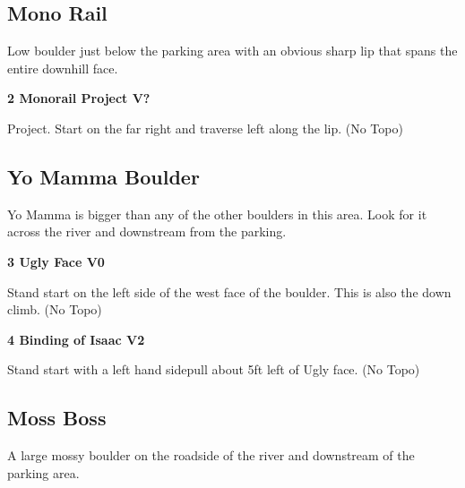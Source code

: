 \begin{multicols}{2}
			
		
		
		\needspace{1.5cm}
		\subsection*{Mono Rail}\label{bf:Mono Rail}
		Low boulder just below the parking area with an obvious sharp lip that spans the entire downhill face.\\
	
		
			
			\needspace{1.5cm}
\label{rt:Monorail Project}
\colorbox{black!20}{
\parbox{0.95\linewidth}{
\textbf{
2 Monorail Project V?  
}}}

			\begin{adjustwidth}{0.5cm}{}			
			Project. Start on the far right and traverse left along the lip. (No Topo)
			\end{adjustwidth}
			
			
		
		
		\needspace{1.5cm}
		\subsection*{Yo Mamma Boulder}\label{bf:Yo Mamma Boulder}
		Yo Mamma is bigger than any of the other boulders in this area. Look for it across the river and downstream from the parking.\\
	
		
			
			\needspace{1.5cm}
\label{rt:Ugly Face}
\colorbox{green!20}{
\parbox{0.95\linewidth}{
\textbf{
3 Ugly Face V0  \warn
}}}

			\begin{adjustwidth}{0.5cm}{}			
			Stand start on the left side of the west face of the boulder. This is also the down climb. (No Topo)
			\end{adjustwidth}
			
			
			
			\needspace{1.5cm}
\label{rt:Binding of Isaac}
\colorbox{green!20}{
\parbox{0.95\linewidth}{
\textbf{
4 Binding of Isaac V2  \warn
}}}

			\begin{adjustwidth}{0.5cm}{}			
			Stand start with a left hand sidepull about 5ft left of Ugly face. (No Topo)
			\end{adjustwidth}
			
			
		
		
		\needspace{1.5cm}
		\subsection*{Moss Boss}\label{bf:Moss Boss}
		A large mossy boulder on the roadside of the river and downstream of the parking area.\\
	

\end{multicols}
